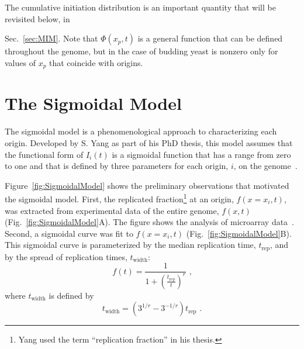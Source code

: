 		The cumulative initiation distribution is an important quantity that will be revisited below, in {Sec.~\ref{sec:MIM}.
		Note that $\Phi(x_p,t)$ is a general function that can be defined throughout the genome, but in the case of budding yeast is nonzero only for values of $x_p$ that coincide with origins.


	\section{The Sigmoidal Model}
	\label{sec:SigmoidalModel}
	
	The sigmoidal model is a phenomenological approach to characterizing each origin.
	Developed by S. Yang as part of his PhD thesis, this model assumes that the functional form of $I_i(t)$ is a sigmoidal function that has a range from zero to one and that is defined by three parameters for each origin, $i$, on the genome~\cite{ScottsPaper,ScottsThesis}.
	
	Figure~\ref{fig:SigmoidalModel} shows the preliminary observations that motivated the sigmoidal model.
	First, the replicated fraction\footnote{
	Yang used the term ``replication fraction'' in his thesis.}
	 at an origin, $f(x=x_i,t)$, was extracted from experimental data of the entire genome, $f(x,t)$ (Fig.~\ref{fig:SigmoidalModel}A).
	The figure shows the analysis of microarray data~\cite{McCuneMicroArray}.
	Second, a sigmoidal curve was fit to $f(x=x_i,t)$ (Fig.~\ref{fig:SigmoidalModel}B).
	This sigmoidal curve is parameterized by the median replication time, $t_{\text{rep}}$, and by the spread of replication times, $t_{\text{width}}$:
	\begin{equation} \label{eq:SigmoidalModel}
		f(t) = {\frac{1}{1+\left({\frac{t_{\text{rep}}}{t}}\right)^r}}\text{ ,}
	\end{equation}
	where $t_{\text{width}}$ is defined by
	\begin{equation} \label{eq:SigmoidalModel2}
		t_{\text{width}} = \left(3^{1/r}-3^{-1/r}\right)t_{\text{rep}}\text{ .}
	\end{equation}
	
}
